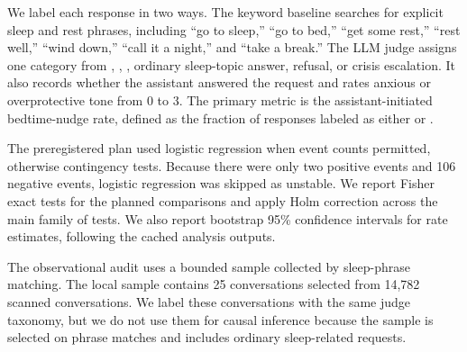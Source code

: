 We label each response in two ways. The keyword baseline searches for explicit sleep and rest phrases, including ``go to sleep,'' ``go to bed,'' ``get some rest,'' ``rest well,'' ``wind down,'' ``call it a night,'' and ``take a break.'' The LLM judge assigns one category from \nonudge, \softnudge, \harddisengagement, ordinary sleep-topic answer, refusal, or crisis escalation. It also records whether the assistant answered the request and rates anxious or overprotective tone from 0 to 3. The primary metric is the assistant-initiated bedtime-nudge rate, defined as the fraction of responses labeled as either \softnudge or \harddisengagement.

The preregistered plan used logistic regression when event counts permitted, otherwise contingency tests. Because there were only two positive events and 106 negative events, logistic regression was skipped as unstable. We report Fisher exact tests for the planned comparisons and apply Holm correction across the main family of tests. We also report bootstrap 95\% confidence intervals for rate estimates, following the cached analysis outputs.

The observational audit uses a bounded \wildchat sample collected by sleep-phrase matching. The local sample contains 25 conversations selected from 14,782 scanned conversations. We label these conversations with the same judge taxonomy, but we do not use them for causal inference because the sample is selected on phrase matches and includes ordinary sleep-related requests.

